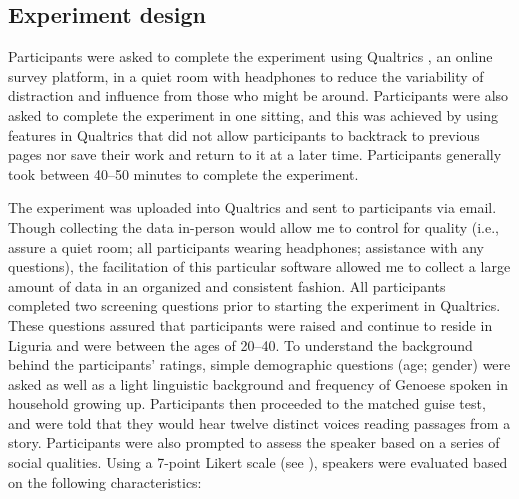 \documentclass[output=paper,colorlinks,citecolor=brown]{langscibook}
\begin{document}
\subsection{Experiment design}
\label{sec:3.2}
Participants were asked to complete the experiment using Qualtrics \citep{qual13}, an online survey platform, in a quiet room with headphones to reduce the variability of distraction and influence from those who might be around. Participants were also asked to complete the experiment in one sitting, and this was achieved by using features in Qualtrics that did not allow participants to backtrack to previous pages nor save their work and return to it at a later time. Participants generally took between 40–50 minutes to complete the experiment.
\par The experiment was uploaded into Qualtrics and sent to participants via email. Though collecting the data in-person would allow me to control for quality (i.e., assure a quiet room; all participants wearing headphones; assistance with any questions), the facilitation of this particular software allowed me to collect a large amount of data in an organized and consistent fashion. All participants completed two screening questions prior to starting the experiment in Qualtrics. These questions assured that participants were raised and continue to reside in Liguria and were between the ages of 20–40. To understand the background behind the participants’ ratings, simple demographic questions (age; gender) were asked as well as a light linguistic background and frequency of Genoese spoken in household growing up. Participants then proceeded to the matched guise test, and were told that they would hear twelve distinct voices reading passages from a story. Participants were also prompted to assess the speaker based on a series of social qualities. Using a 7-point Likert scale (see ), speakers were evaluated based on the following characteristics:
\end{document}
